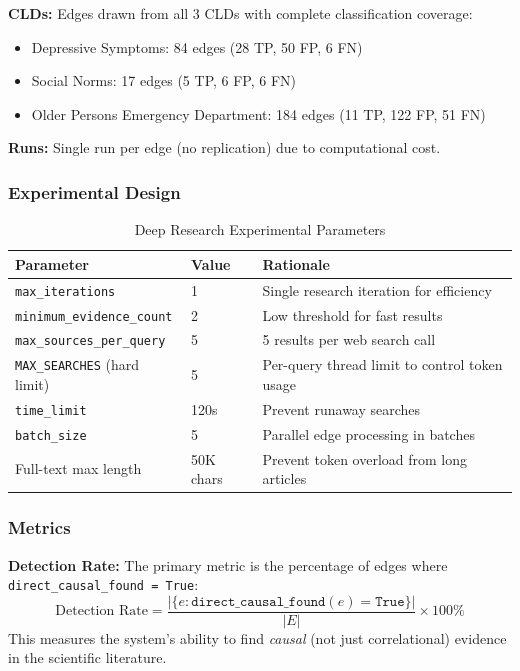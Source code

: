 \textbf{CLDs:} Edges drawn from all 3 CLDs with complete classification coverage:
\begin{itemize}[noitemsep]
    \item Depressive Symptoms: 84 edges (28 TP, 50 FP, 6 FN)
    \item Social Norms: 17 edges (5 TP, 6 FP, 6 FN)
    \item Older Persons Emergency Department: 184 edges (11 TP, 122 FP, 51 FN)
\end{itemize}

\textbf{Runs:} Single run per edge (no replication) due to computational cost.

\subsubsection{Experimental Design}

\begin{table}[H]
\centering
\caption{Deep Research Experimental Parameters}
\label{tab:dr_params}
\footnotesize
\begin{tabular}{@{}l l l@{}}
\toprule
\textbf{Parameter} & \textbf{Value} & \textbf{Rationale} \\
\midrule
\texttt{max\_iterations} & 1 & Single research iteration for efficiency \\
\texttt{minimum\_evidence\_count} & 2 & Low threshold for fast results \\
\texttt{max\_sources\_per\_query} & 5 & 5 results per web search call \\
\texttt{MAX\_SEARCHES} (hard limit) & 5 & Per-query thread limit to control token usage \\
\texttt{time\_limit} & 120s & Prevent runaway searches \\
\texttt{batch\_size} & 5 & Parallel edge processing in batches \\
Full-text max length & 50K chars & Prevent token overload from long articles \\
\bottomrule
\end{tabular}
\end{table}

\subsubsection{Metrics}

\textbf{Detection Rate:} The primary metric is the percentage of edges where \texttt{direct\_causal\_found = True}:
\[
\text{Detection Rate} = \frac{|\{e : \texttt{direct\_causal\_found}(e) = \texttt{True}\}|}{|E|} \times 100\%
\]
This measures the system's ability to find \textit{causal} (not just correlational) evidence in the scientific literature.

